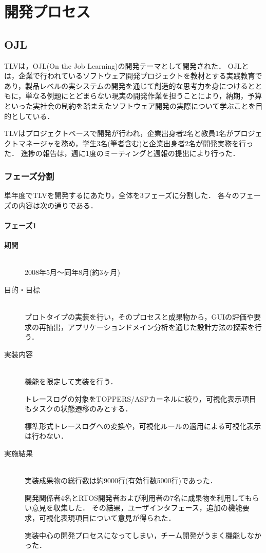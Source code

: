 \chapter{開発プロセス}

\section{OJL}

TLVは，OJL(On the Job Learning)の開発テーマとして開発された．
OJLとは，企業で行われているソフトウェア開発プロジェクトを教材とする実践教育であり，製品レベルの実システムの開発を通じて創造的な思考力を身につけるとともに，単なる例題にとどまらない現実の開発作業を担うことにより，納期，予算といった実社会の制約を踏まえたソフトウェア開発の実際について学ぶことを目的としている．

TLVはプロジェクトベースで開発が行われ，企業出身者2名と教員1名がプロジェクトマネージャを務め，学生3名(筆者含む)と企業出身者2名が開発実務を行った．
進捗の報告は，週に1度のミーティングと週報の提出により行った．

\subsection{フェーズ分割}

単年度でTLVを開発するにあたり，全体を3フェーズに分割した．
各々のフェーズの内容は次の通りである．

\subsubsection{フェーズ1}

\begin{description}
\item[期間] \mbox{} \\
2008年5月～同年8月(約3ヶ月)

\item[目的・目標] \mbox{} \\
プロトタイプの実装を行い，そのプロセスと成果物から，GUIの評価や要求の再抽出，アプリケーションドメイン分析を通じた設計方法の探索を行う．

\item[実装内容] \mbox{} \\
機能を限定して実装を行う．

トレースログの対象をTOPPERS/ASPカーネルに絞り，可視化表示項目もタスクの状態遷移のみとする．

標準形式トレースログへの変換や，可視化ルールの適用による可視化表示は行わない．

\item[実施結果] \mbox{} \\
実装成果物の総行数は約9000行(有効行数5000行)であった．

開発関係者4名とRTOS開発者および利用者の7名に成果物を利用してもらい意見を収集した．
その結果，ユーザインタフェース，追加の機能要求，可視化表現項目について意見が得られた．

実装中心の開発プロセスになってしまい，チーム開発がうまく機能しなかった．

\end{description}

